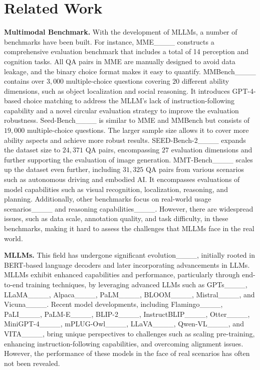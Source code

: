 \section{Related Work}
\textbf{Multimodal Benchmark.} 
With the development of MLLMs, a number of benchmarks have been built.
For instance, MME____ constructs a comprehensive evaluation benchmark that includes a total of 14 perception and cognition tasks. All QA pairs in MME are manually designed to avoid data leakage, and the binary choice format makes it easy to quantify.
MMBench____ contains over $3,000$ multiple-choice questions covering $20$ different ability dimensions, such as object localization and social reasoning. 
It introduces GPT-4-based choice matching to address the MLLM's lack of instruction-following capability and a novel circular evaluation strategy to improve the evaluation robustness.
Seed-Bench____ is similar to MME and MMBench but consists of $19,000$ multiple-choice questions. The larger sample size allows it to cover more ability aspects and achieve more robust results.
SEED-Bench-2____ expands the dataset size to $24,371$ QA pairs, encompassing $27$ evaluation dimensions and further supporting the evaluation of image generation.
MMT-Bench____ scales up the dataset even further, including $31,325$ QA pairs from various scenarios such as autonomous driving and embodied AI. It encompasses evaluations of model capabilities such as visual recognition, localization, reasoning, and planning.
Additionally, other benchmarks focus on real-world usage scenarios____ and reasoning capabilities____. 
However, there are widespread issues, such as data scale, annotation quality, and task difficulty, in these benchmarks, making it hard to assess the challenges that MLLMs face in the real world.

\textbf{MLLMs.} 
This field has undergone significant evolution____, initially rooted in BERT-based language decoders and later incorporating advancements in LLMs. 
MLLMs exhibit enhanced capabilities and performance, particularly through end-to-end training techniques, by leveraging advanced LLMs such as GPTs____,
LLaMA____, 
Alpaca____, PaLM____, BLOOM____, 
Mistral____, and Vicuna____. Recent model developments, including Flamingo____, PaLI____, PaLM-E____, BLIP-2____, InstructBLIP____, Otter____, MiniGPT-4____, mPLUG-Owl____, LLaVA____, Qwen-VL____, and VITA____, bring unique perspectives to challenges such as scaling pre-training, enhancing instruction-following capabilities, and overcoming alignment issues. 
However, the performance of these models in the face of real scenarios has often not been revealed.

